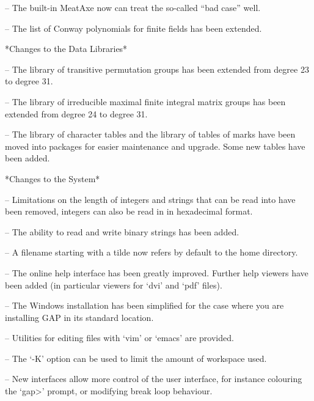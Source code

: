 \item{--}
The built-in MeatAxe now can treat the so-called ``bad case'' well.

\item{--}
The list of Conway polynomials for finite fields has been extended.
\endlist

*Changes to the Data Libraries*
\beginlist%

\item{--}
The library of transitive permutation groups has been extended from degree
23 to degree 31.

\item{--}
The library of irreducible maximal finite integral matrix groups has
been extended from degree 24 to degree 31.

\item{--}
The library of character tables and the library of tables of marks
have been moved into packages for easier maintenance and upgrade. Some
new tables have been added.

\endlist

*Changes to the System*

\beginlist%

\item{--}
Limitations on the length of integers and strings that can be read
into {\GAP} have been removed, integers can also be read in in
hexadecimal format.

\item{--}
The ability to read and write binary strings has been added.

\item{--}
A filename starting with a tilde now refers by default to the home
directory.

\item{--}
The online help interface has been greatly improved. Further help viewers have been added (in
particular viewers for `dvi' and `pdf' files).

\item{--}
The Windows installation has been simplified for the case where you
are installing GAP in its standard location.

\item{--}
Utilities for editing {\GAP} files with `vim' or `emacs' are provided.

\item{--}
The `-K' option can be used to limit the amount of workspace used. 

\item{--}
New interfaces allow more control of the user interface, for instance
colouring the `gap>' prompt, or modifying break loop behaviour.


